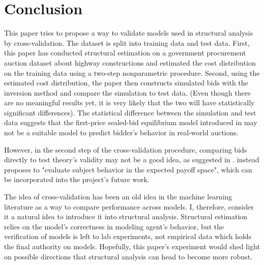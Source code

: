\documentclass[11pt]{article}
\begin{document}
\section{Conclusion}
This paper tries to propose a way to validate models used in structural analysis 
by cross-validation. The dataset is split into training data and test 
data.
First, this paper has conducted structural estimation on a government 
procurement auction dataset about highway constructions and estimated the 
cost distribution on the training data using a two-step nonparametric procedure.
Second, using the 
estimated cost distribution, the paper then constructs simulated bids with the 
inversion method and compare the simulation to test data. 
(Even though there are no meaningful results yet, it is very likely that 
the two will have statistically significant differences). 
The statistical difference between the simulation and test data suggests that 
the first-price sealed-bid equilibrium model introduced in \citeauthor{RileySamuelson1981} 
\citeyear{RileySamuelson1981} may not be a suitable model to predict bidder's 
behavior in real-world auctions. 

However, in the second step of the cross-validation procedure, comparing bids 
directly to test theory's validity may not be a good idea, as suggested in 
\citeauthor{Harrison1989} \citeyear{Harrison1989}. \citeauthor{Harrison1989}
\citeyear{Harrison1989} instead proposes to "evaluate subject behavior in the 
expected payoff space", which can be incorporated into the project's future work.

The idea of cross-validation has been an old idea in the machine learning 
literature as a way to compare performance across models. I, therefore, consider 
it a natural idea to introduce it into structural analysis. Structural estimation 
relies on the model's correctness in modeling agent's behavior, but the verification 
of models is left to lab experiments, not empirical data which holds the final 
authority on models. Hopefully, this paper's experiment would shed light on 
possible directions that structural analysis can head to become more robust. 


\medskip



\end{document}
